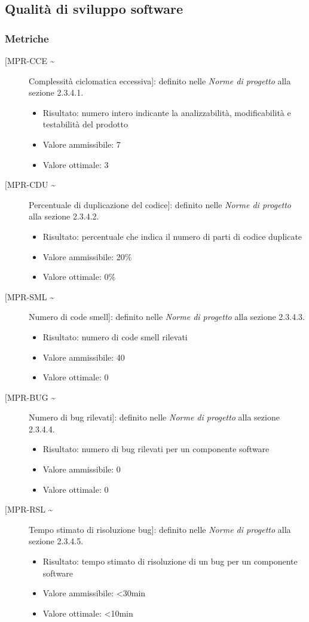 \documentclass[../piano-di-qualifica.tex]{subfiles}
\begin{document}
\subsection{Qualità di sviluppo software}


\subsubsection{Metriche}%
\label{subsec:metriche_svil_sw}

\begin{description}
  \item [[MPR-CCE \textasciitilde] Complessità ciclomatica eccessiva]: definito nelle \textit{Norme di progetto} alla sezione 2.3.4.1.
        \begin{itemize} \item Risultato: numero intero indicante la analizzabilità, modificabilità e testabilità del prodotto \item Valore ammissibile: \leq{}  7  \item Valore ottimale: \leq{}  3 \end{itemize}
  \item [[MPR-CDU \textasciitilde] Percentuale di duplicazione del codice]: definito nelle \textit{Norme di progetto} alla sezione 2.3.4.2.
        \begin{itemize} \item Risultato: percentuale che indica il numero di parti di codice duplicate \item Valore ammissibile: 20\% \item Valore ottimale: 0\% \end{itemize}
  \item [[MPR-SML \textasciitilde] Numero di code smell]: definito nelle \textit{Norme di progetto} alla sezione 2.3.4.3.
        \begin{itemize} \item Risultato: numero di code smell rilevati \item Valore ammissibile: 40 \item Valore ottimale: 0 \end{itemize}
  \item [[MPR-BUG \textasciitilde] Numero di bug rilevati]: definito nelle \textit{Norme di progetto} alla sezione 2.3.4.4.
        \begin{itemize} \item Risultato: numero di bug rilevati per un componente software \item Valore ammissibile: 0 \item Valore ottimale: 0 \end{itemize}
  \item [[MPR-RSL \textasciitilde] Tempo stimato di risoluzione bug]: definito nelle \textit{Norme di progetto} alla sezione 2.3.4.5.
        \begin{itemize} \item Risultato: tempo stimato di risoluzione di un bug per un componente software \item Valore ammissibile: <30min \item Valore ottimale: <10min \end{itemize}
\end{description}
\end{document}
